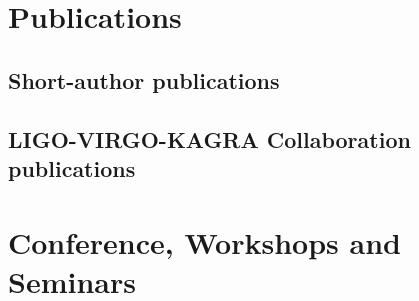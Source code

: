 \documentclass[12pt]{article}
\begin{document}
\section{Publications}
\subsection{Short-author publications}
\label{Short-author_publications}

\subsection{LIGO-VIRGO-KAGRA Collaboration publications}
\label{LIGO-VIRGO-KAGRA_Collaboration_publications}



\section{Conference, Workshops and Seminars}
\end{document}
